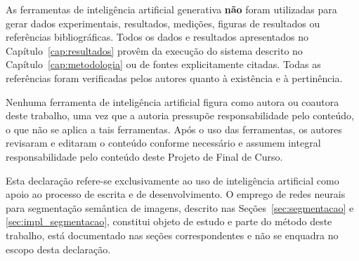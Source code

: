 \documentclass[
    12pt,
    openright,
    oneside,
    a4paper,
    english,
    brazil
]{abntex2}
\begin{document}
As ferramentas de inteligência artificial generativa \textbf{não} foram utilizadas para gerar dados experimentais, resultados, medições, figuras de resultados ou referências bibliográficas. Todos os dados e resultados apresentados no Capítulo~\ref{cap:resultados} provêm da execução do sistema descrito no Capítulo~\ref{cap:metodologia} ou de fontes explicitamente citadas. Todas as referências foram verificadas pelos autores quanto à existência e à pertinência.

Nenhuma ferramenta de inteligência artificial figura como autora ou coautora deste trabalho, uma vez que a autoria pressupõe responsabilidade pelo conteúdo, o que não se aplica a tais ferramentas. Após o uso das ferramentas, os autores revisaram e editaram o conteúdo conforme necessário e assumem integral responsabilidade pelo conteúdo deste Projeto de Final de Curso.

Esta declaração refere-se exclusivamente ao uso de inteligência artificial como apoio ao processo de escrita e de desenvolvimento. O emprego de redes neurais para segmentação semântica de imagens, descrito nas Seções~\ref{sec:segmentacao} e \ref{sec:impl_segmentacao}, constitui objeto de estudo e parte do método deste trabalho, está documentado nas seções correspondentes e não se enquadra no escopo desta declaração.


\end{document}
